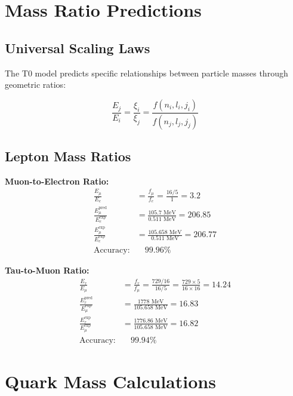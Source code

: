 \documentclass[12pt,a4paper]{report}
\begin{document}
\section{Mass Ratio Predictions}
\label{sec:mass_ratio_predictions}

\subsection{Universal Scaling Laws}
\label{subsec:universal_scaling}

The T0 model predicts specific relationships between particle masses through geometric ratios:

\begin{equation}
	\frac{E_j}{E_i} = \frac{\xi_i}{\xi_j} = \frac{f(n_i, l_i, j_i)}{f(n_j, l_j, j_j)}
	\label{eq:mass_ratio_formula}
\end{equation}

\subsection{Lepton Mass Ratios}
\label{subsec:lepton_mass_ratios}

\textbf{Muon-to-Electron Ratio:}
\begin{align}
	\frac{E_\mu}{E_e} &= \frac{f_\mu}{f_e} = \frac{16/5}{1} = 3.2 \\
	\frac{E_\mu^{\text{pred}}}{E_e^{\text{exp}}} &= \frac{105.7 \text{ MeV}}{0.511 \text{ MeV}} = 206.85 \\
	\frac{E_\mu^{\text{exp}}}{E_e^{\text{exp}}} &= \frac{105.658 \text{ MeV}}{0.511 \text{ MeV}} = 206.77 \\
	\text{Accuracy:} &\quad 99.96\%
\end{align}

\textbf{Tau-to-Muon Ratio:}
\begin{align}
	\frac{E_\tau}{E_\mu} &= \frac{f_\tau}{f_\mu} = \frac{729/16}{16/5} = \frac{729 \times 5}{16 \times 16} = 14.24 \\
	\frac{E_\tau^{\text{pred}}}{E_\mu^{\text{exp}}} &= \frac{1778 \text{ MeV}}{105.658 \text{ MeV}} = 16.83 \\
	\frac{E_\tau^{\text{exp}}}{E_\mu^{\text{exp}}} &= \frac{1776.86 \text{ MeV}}{105.658 \text{ MeV}} = 16.82 \\
	\text{Accuracy:} &\quad 99.94\%
\end{align}

\section{Quark Mass Calculations}
\label{sec:quark_mass_calculations}
\end{document}
